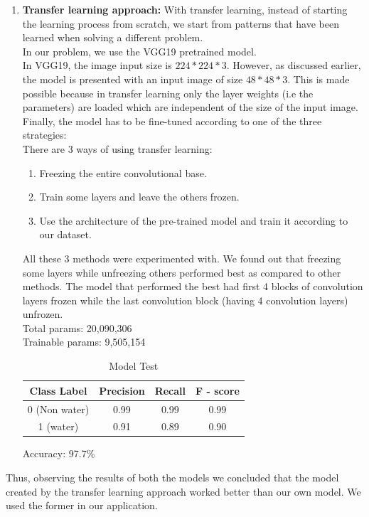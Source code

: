 \documentclass{IEEEtran}
\begin{document}
\begin{enumerate}
\item \textbf {Transfer learning approach:}
With transfer learning, instead of starting the learning process from scratch, we start from patterns that have been learned when solving a different problem.\\
In our problem, we use the VGG19 pretrained model.\\
In VGG19, the image input size is $224*224*3$. However, as discussed earlier, the model is presented with an input image of size $48*48*3$. This is made possible because in transfer learning only the layer weights (i.e the parameters) are loaded which are independent of the size of the input image. \\
Finally, the model has to be fine-tuned according to one of the three strategies:\\
There are 3 ways of using transfer learning:
\begin{enumerate}
\item Freezing the entire convolutional base.
\item Train some layers and leave the others frozen.
\item Use the architecture of the pre-trained model and train it according to our dataset.
\end{enumerate}
All these 3 methods were experimented with. We found out that freezing some layers while unfreezing others performed best as compared to other methods.
The model that performed the best had first 4 blocks of convolution layers frozen while the last convolution block (having 4 convolution layers) unfrozen.\\
Total params: 20,090,306\\
Trainable params: 9,505,154\\
\begin{table}[h!]
\caption{Model Test}
\begin{center}
	\begin{tabular}{|c|c|c|c|}
\hline
Class Label & Precision & Recall & F - score\\ \hline
0 (Non water) & 0.99  & 0.99 & 0.99\\ \hline
1 (water) & 0.91 & 0.89 & 0.90\\ \hline
	\end{tabular}
\end{center}
\end{table}
Accuracy: 97.7\%

\end{enumerate}
Thus, observing the results of both the models we concluded that the model created by the transfer learning approach worked better than our own model. We used the former in our application.
\end{document}
